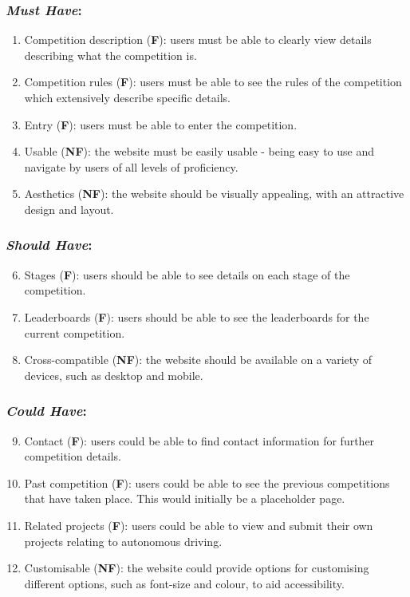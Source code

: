 \documentclass{l4proj}
\begin{document}
\subsubsection{\textit{Must Have}:}
\begin{enumerate}[label=A.\arabic*]
    \item Competition description (\textbf{F}): users must be able to clearly view details describing what the competition is. \label{req:comp-description}
    \item Competition rules (\textbf{F}): users must be able to see the rules of the competition which extensively describe specific details. \label{req:comp-rules}
    \item Entry (\textbf{F}): users must be able to enter the competition. \label{req:comp-entry}
    \item Usable (\textbf{NF}): the website must be easily usable - being easy to use and navigate by users of all levels of proficiency.
    \item Aesthetics (\textbf{NF}): the website should be visually appealing, with an attractive design and layout.
\end{enumerate}

\subsubsection{\textit{Should Have}:}
\begin{enumerate}[label=A.\arabic*]
\setcounter{enumi}{5}
    \item Stages (\textbf{F}): users should be able to see details on each stage of the competition. \label{req:comp-stages}
    \item Leaderboards (\textbf{F}): users should be able to see the leaderboards for the current competition. \label{req:comp-leaderboards}
    \item Cross-compatible (\textbf{NF}): the website should be available on a variety of devices, such as desktop and mobile.
\end{enumerate}

\subsubsection{\textit{Could Have}:}
\begin{enumerate}[label=A.\arabic*]
\setcounter{enumi}{8}
    \item Contact (\textbf{F}): users could be able to find contact information for further competition details. \label{req:comp-contact}
    \item Past competition (\textbf{F}): users could be able to see the previous competitions that have taken place. This would initially be a placeholder page. \label{req:comp-past-comps}
    \item Related projects (\textbf{F}): users could be able to view and submit their own projects relating to autonomous driving.
    \item Customisable (\textbf{NF}): the website could provide options for customising different options, such as font-size and colour, to aid accessibility.
\end{enumerate}
\end{document}
